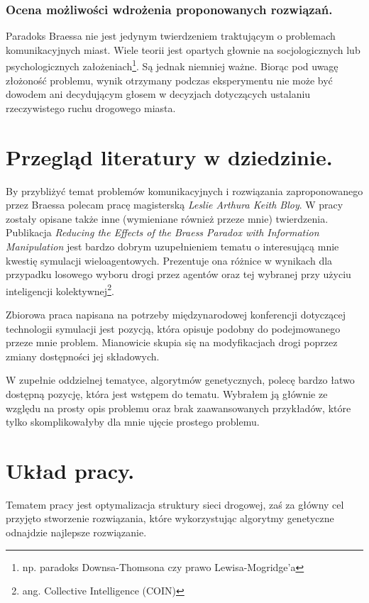 \documentclass[twoside,12pt]{report}
\begin{document}
\subsubsection{Ocena możliwości wdrożenia proponowanych rozwiązań.}
Paradoks Braessa nie jest jedynym twierdzeniem traktującym o problemach komunikacyjnych miast. Wiele teorii jest opartych głownie na socjologicznych lub psychologicznych założeniach\footnote{np. paradoks Downsa-Thomsona\cite{downs} czy prawo Lewisa-Mogridge’a\cite{lewis}}. Są jednak niemniej ważne.
Biorąc pod uwagę złożoność problemu, wynik otrzymany podczas eksperymentu nie może być dowodem ani decydującym głosem w decyzjach dotyczących ustalaniu rzeczywistego ruchu drogowego miasta. 


\section{Przegląd literatury w dziedzinie.}
By przybliżyć temat problemów komunikacyjnych i rozwiązania zaproponowanego przez Braessa polecam pracę magisterską \textit{Leslie Arthura Keith Bloy}\cite{investigation}. W pracy zostały opisane także inne (wymieniane również przeze mnie) twierdzenia. Publikacja \textit{Reducing the Effects of the Braess Paradox with Information Manipulation}\cite{reducingtheeffects} jest bardzo dobrym uzupełnieniem tematu o interesującą mnie kwestię symulacji wieloagentowych. Prezentuje ona różnice w wynikach dla przypadku losowego wyboru drogi przez agentów oraz tej wybranej przy użyciu inteligencji kolektywnej\footnote{ang. Collective Intelligence (COIN)}. 

Zbiorowa praca napisana na potrzeby międzynarodowej konferencji dotyczącej technologii symulacji\cite{reducingtheeffects} jest pozycją, która opisuje podobny do podejmowanego przeze mnie problem. Mianowicie skupia się na modyfikacjach drogi poprzez zmiany dostępności jej składowych.

W zupełnie oddzielnej tematyce, algorytmów genetycznych, polecę bardzo łatwo dostępną pozycję, która jest wstępem do tematu\cite{gene}. Wybrałem ją głównie ze względu na prosty opis problemu oraz brak zaawansowanych przykładów, które tylko skomplikowałyby dla mnie ujęcie prostego problemu.

\section{Układ pracy.}
Tematem pracy jest optymalizacja struktury sieci drogowej, zaś za główny cel przyjęto stworzenie rozwiązania, które wykorzystując algorytmy genetyczne odnajdzie najlepsze rozwiązanie.
 
\end{document}
